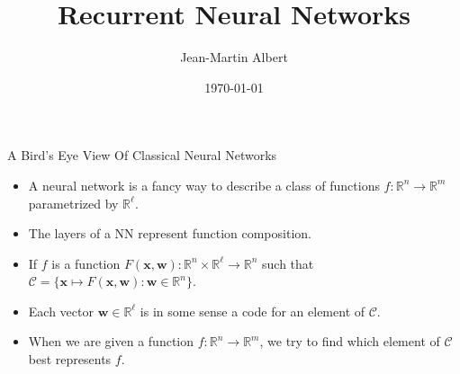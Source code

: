 \documentclass[10pt]{beamer}
\newcommand{\R}{\mathbb{R}}
\newcommand{\C}{\mathcal{C}}
\newcommand{\w}{\mathbf{w}}
\newcommand{\x}{\mathbf{x}}
\begin{document}
\title{Recurrent Neural Networks}
\author{Jean-Martin Albert}
\date{\today}
\maketitle


\begin{frame}{A Bird's Eye View Of Classical Neural Networks}

\begin{itemize}
  \item A neural network is a fancy way to describe a class of functions $f:\R^n\to \R^m$ parametrized by $\R^\ell$.
  \item The layers of a NN represent function composition.
  \item If $f$ is a function $F(\x, \w):\R^n\times \R^\ell\to\R^n$ such that $\C=\{\x\mapsto F(\x, \w):\w\in\R^n\}$.
  \item Each vector $\w\in\R^\ell$ is in some sense a code for an element of $\C$.
  \item When we are given a function $f:\R^n\to \R^m$, we try to find which element of $\C$ best represents $f$.

\end{itemize}

\end{frame}
\end{document}
